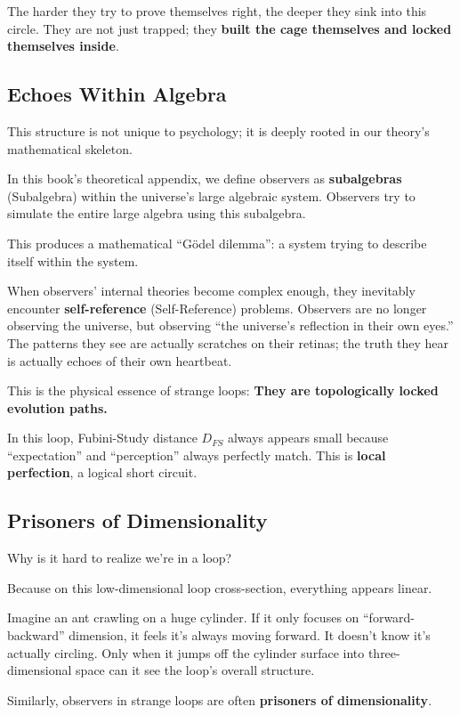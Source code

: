\documentclass[11pt,a4paper,twoside]{book}
\begin{document}
The harder they try to prove themselves right, the deeper they sink into this circle. They are not just trapped; they \textbf{built the cage themselves and locked themselves inside}.

\subsection{Echoes Within Algebra}

This structure is not unique to psychology; it is deeply rooted in our theory's mathematical skeleton.

In this book's theoretical appendix, we define observers as \textbf{subalgebras} (Subalgebra) within the universe's large algebraic system. Observers try to simulate the entire large algebra using this subalgebra.

This produces a mathematical ``Gödel dilemma'': a system trying to describe itself within the system.

When observers' internal theories become complex enough, they inevitably encounter \textbf{self-reference} (Self-Reference) problems. Observers are no longer observing the universe, but observing ``the universe's reflection in their own eyes.'' The patterns they see are actually scratches on their retinas; the truth they hear is actually echoes of their own heartbeat.

This is the physical essence of strange loops: \textbf{They are topologically locked evolution paths.}

In this loop, Fubini-Study distance $D_{FS}$ always appears small because ``expectation'' and ``perception'' always perfectly match. This is \textbf{local perfection}, a logical short circuit.

\subsection{Prisoners of Dimensionality}

Why is it hard to realize we're in a loop?

Because on this low-dimensional loop cross-section, everything appears linear.

Imagine an ant crawling on a huge cylinder. If it only focuses on ``forward-backward'' dimension, it feels it's always moving forward. It doesn't know it's actually circling. Only when it jumps off the cylinder surface into three-dimensional space can it see the loop's overall structure.

Similarly, observers in strange loops are often \textbf{prisoners of dimensionality}.
\end{document}
